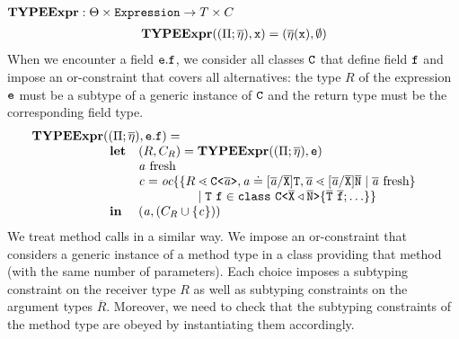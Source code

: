 \documentclass[a4paper,USenglish,cleveref, autoref, thm-restate, anonymous]{lipics-v2021}
\begin{document}
\noindent
$\textbf{TYPEExpr}: \Theta \times
\texttt{Expression} \rightarrow {T} \times C
$
\begin{gather*}
  \textbf{TYPEExpr} (({\Pi} ; 
  \overline{\mathtt{\eta}}), \mathtt{x}) =
  (\overline{\mathtt{\eta}} ({\tt x}) , \emptyset)
\end{gather*}
When we encounter a field ${\tt e}.{\tt f}$, we consider all classes
${\tt C}$
that define field ${\tt f}$ and impose an or-constraint that covers all
alternatives: the type $R$ of the expression ${\tt e}$ must be a subtype of a generic instance
of ${\tt C}$ and the return type must be the corresponding field type. 
\begin{gather*}
  \begin{array}{@{}l@{}l}
    \typeExpr{} &(({\mtypeEnvironment} ;
                  \overline{\localVarAssumption}), \texttt{e}.\texttt{f}) = \\
                & \begin{array}{ll}
                    \textbf{let} 
                    & ({R}, \consSet_R) = \typeExpr(({\mtypeEnvironment} ;
                      \overline{\localVarAssumption}), \texttt{e})\\
                    & \tv{a} \text{ fresh} \\
                    & \constraint = \begin{array}[t]{@{}l@{}l}
                      \orCons\set{
                      \set{ &
                      {R} \lessdot \exptype{C}{\ol{\tv{a}}} , \tv{a} \doteq
                      [\overline{\tv{a}}/\ol{X}]\type{T} , \ol{\tv{a}} \lessdot [\overline{\tv{a}}/\ol{X}]\ol{N}
                      \mid \overline{\tv{a}} \text{ fresh}
                      } \\
                      & \quad \mid \mv{T}\ \mv{f} \in \texttt{class}\ \exptype{C}{\ol{X} \triangleleft \ol{N}} \set{ \ol{T}\ \ol{f}; \ldots}
                      }\end{array}\\
                    {\mathbf{in}} & {
                    (\tv{a}, (\consSet_R \cup \set{\constraint}))}
                  \end{array} 
  \end{array}
\end{gather*}
We treat method calls in a similar way. We impose an or-constraint
that considers a generic instance of a method type in a class
providing that method (with the same number of parameters). Each
choice imposes a subtyping constraint on the receiver type  $R$ as
well as subtyping constraints on the argument types
$\overline{R}$. Moreover, we need to check that the subtyping
constraints of the method type are obeyed by instantiating them
accordingly.
\end{document}
